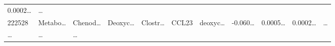 \documentclass[
]{article}
\begin{document}
\begin{longtable}[]{@{}lllllllllll@{}}
\begin{minipage}[t]{0.07\columnwidth}
0.0002\ldots{}\strut
\end{minipage} & \begin{minipage}[t]{0.03\columnwidth}\raggedright
\ldots{}\strut
\end{minipage}\tabularnewline
\begin{minipage}[t]{0.05\columnwidth}\raggedright
222528\strut
\end{minipage} & \begin{minipage}[t]{0.07\columnwidth}\raggedright
Metabo\ldots{}\strut
\end{minipage} & \begin{minipage}[t]{0.07\columnwidth}\raggedright
Chenod\ldots{}\strut
\end{minipage} & \begin{minipage}[t]{0.09\columnwidth}\raggedright
Deoxyc\ldots{}\strut
\end{minipage} & \begin{minipage}[t]{0.07\columnwidth}\raggedright
Clostr\ldots{}\strut
\end{minipage} & \begin{minipage}[t]{0.07\columnwidth}\raggedright
CCL23\strut
\end{minipage} & \begin{minipage}[t]{0.09\columnwidth}\raggedright
deoxyc\ldots{}\strut
\end{minipage} & \begin{minipage}[t]{0.07\columnwidth}\raggedright
-0.060\ldots{}\strut
\end{minipage} & \begin{minipage}[t]{0.07\columnwidth}\raggedright
0.0005\ldots{}\strut
\end{minipage} & \begin{minipage}[t]{0.07\columnwidth}\raggedright
0.0002\ldots{}\strut
\end{minipage} & \begin{minipage}[t]{0.03\columnwidth}\raggedright
\ldots{}\strut
\end{minipage}\tabularnewline
\begin{minipage}[t]{0.05\columnwidth}\raggedright
\ldots{}\strut
\end{minipage} & \begin{minipage}[t]{0.07\columnwidth}\raggedright
\ldots{}\strut
\end{minipage} & \begin{minipage}[t]{0.07\columnwidth}\raggedright
\ldots{}\strut
\end{minipage} & \begin{minipage}[t]{0.09\columnwidth}\raggedright

\end{minipage}
\end{longtable}
\end{document}
